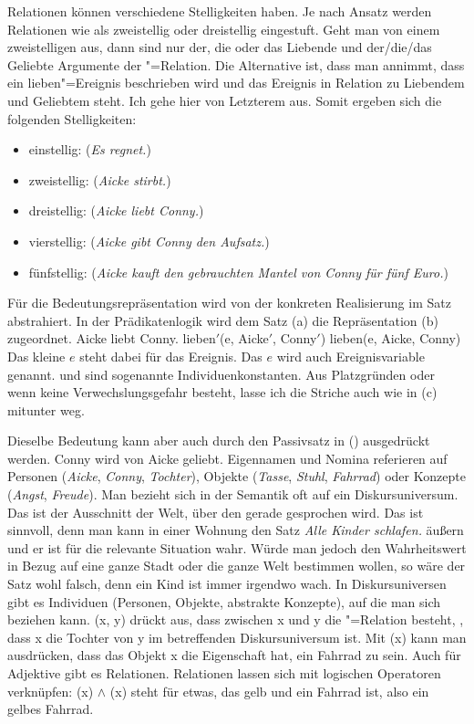 Relationen können verschiedene Stelligkeiten haben. Je nach Ansatz werden Relationen wie
 als zweistellig oder dreistellig eingestuft. Geht man von einem zweistelligen
 aus, dann sind nur der, die oder das Liebende und der/die/das Geliebte Argumente der
"=Relation. Die Alternative ist, dass man annimmt, dass ein lieben"=Ereignis
beschrieben wird und das Ereignis in Relation zu Liebendem und Geliebtem steht. Ich gehe hier von
Letzterem aus. Somit ergeben sich die folgenden Stelligkeiten:
\begin{itemize}
\item einstellig:     (\emph{Es regnet.}) 
\item zweistellig:   (\emph{Aicke stirbt.})
\item dreistellig:    (\emph{Aicke liebt Conny.})
\item vierstellig:     (\emph{Aicke gibt Conny den Aufsatz.})
\item fünfstellig:    (\emph{Aicke kauft den gebrauchten Mantel von Conny für fünf Euro.})
\end{itemize}
Für die Bedeutungsrepräsentation wird von der konkreten Realisierung im Satz abstrahiert. 
In der Prädikatenlogik wird \zb dem Satz (a) die Repräsentation (b) zugeordnet.
\eal
\ex Aicke liebt Conny.
\ex lieben$'$(e, Aicke$'$, Conny$'$)
\ex lieben(e, Aicke, Conny)
\zl
Das kleine $e$ steht dabei für das Ereignis. Das $e$ wird auch Ereignisvariable
genannt.  und  sind sogenannte Individuenkonstanten. Aus
Platzgründen oder wenn keine Verwechslungsgefahr besteht, lasse ich die Striche auch wie in (c) mitunter weg. 

Dieselbe Bedeutung kann aber auch durch den Passivsatz in () ausgedrückt werden.
\ea
Conny wird von Aicke geliebt.
\z
Eigennamen und Nomina referieren auf Personen (\emph{Aicke}, \emph{Conny}, \emph{Tochter}), Objekte (\emph{Tasse},
\emph{Stuhl}, \emph{Fahrrad}) oder Konzepte (\emph{Angst}, \emph{Freude}). Man bezieht sich in der
Semantik oft auf ein Diskursuniversum. Das ist der Ausschnitt der Welt, über den gerade
gesprochen wird. Das ist sinnvoll, denn man kann in einer Wohnung den Satz \emph{Alle Kinder
  schlafen.} äußern und er ist für die relevante Situation wahr. Würde man jedoch den Wahrheitswert
in Bezug auf eine ganze Stadt oder die ganze Welt bestimmen wollen, so wäre der Satz wohl falsch,
denn ein Kind ist immer irgendwo wach.
In Diskursuniversen gibt es Individuen (Personen, Objekte, abstrakte Konzepte), auf
die man sich beziehen kann. (x, y) drückt aus, dass zwischen x und y die
"=Relation besteht, \dash, dass x die Tochter von y im betreffenden
Diskursuniversum ist. Mit (x) kann man ausdrücken, dass das Objekt x die
Eigenschaft hat, ein Fahrrad zu sein. Auch für Adjektive gibt es Relationen. Relationen lassen sich
mit logischen Operatoren verknüpfen: (x) $\wedge$ (x) steht für
etwas, das gelb und ein Fahrrad ist, also ein gelbes Fahrrad.


